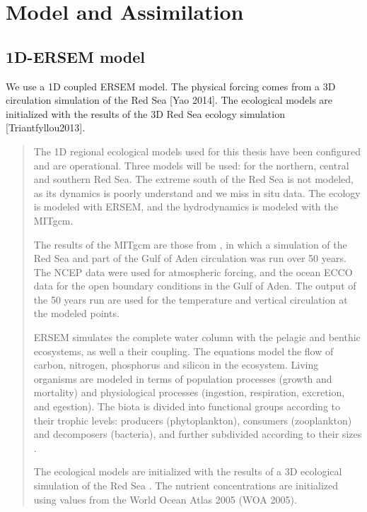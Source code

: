 \section{Model and Assimilation}

\subsection{1D-ERSEM model}

We use a 1D coupled ERSEM model. The physical forcing comes from a 3D
circulation simulation of the Red Sea [Yao 2014]. The ecological models are
initialized with the results of the 3D Red Sea ecology simulation
[Triantfyllou2013].

\begin{quotation} The 1D regional ecological models used for this thesis have
been configured and are operational. Three models will be used: for the
northern, central and southern Red Sea. The extreme south of the Red Sea is not
modeled, as its dynamics is poorly understand and we miss in situ data.  The
ecology is modeled with ERSEM, and the hydrodynamics is modeled with the
MITgcm.

The results of the MITgcm are those from \citet{Yao2014, Yao2014b}, in which a
simulation of the Red Sea and part of the Gulf of Aden circulation was run over
50 years. The NCEP data were used for atmospheric forcing, and the ocean ECCO
data for the open boundary conditions in the Gulf of Aden. The output of the 50
years run are used for the temperature and vertical circulation at the modeled
points.

ERSEM simulates the complete water column with the pelagic and benthic
ecosystems, as well a their coupling. The equations model the flow of carbon,
nitrogen, phosphorus and silicon in the ecosystem. Living organisms are modeled
in terms of population processes (growth and mortality) and physiological
processes (ingestion, respiration, excretion, and egestion). The biota is
divided into functional groups according to their trophic levels: producers
(phytoplankton), consumers (zooplankton) and decomposers (bacteria), and
further subdivided according to their sizes \citep{Baretta1995}.

The ecological models are initialized with the results of a 3D ecological
simulation of the Red Sea \citep{Triantafyllou2014}. The nutrient
concentrations are initialized using values from the World Ocean Atlas 2005
(WOA 2005).  \end{quotation}

